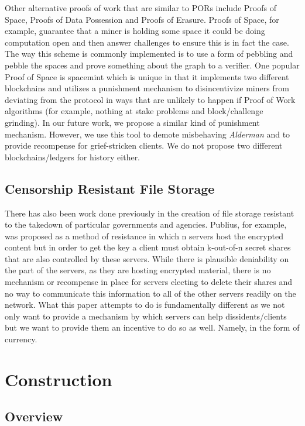 \documentclass{article}
\begin{document}
Other alternative proofs of work that are similar to PORs include Proofs of Space, Proofs of Data Possession and Proofs of Erasure. Proofs of Space, for example, guarantee that a miner is holding some space it could be doing computation open and then answer challenges to ensure this is in fact the case. The way this scheme is commonly implemented is to use a form of pebbling and pebble the spaces and prove something about the graph to a verifier. One popular Proof of Space is spacemint which is unique in that it implements two different blockchains and utilizes a punishment mechanism to disincentivize miners from deviating from the protocol in ways that are unlikely to happen if Proof of Work algorithms (for example, nothing at stake problems and block/challenge grinding). In our future work, we propose a similar kind of punishment mechanism. However, we use this tool to demote misbehaving \emph{Alderman} and to provide recompense for grief-stricken clients. We do not propose two different blockchains/ledgers for history either. 

\subsection{Censorship Resistant File Storage}
There has also been work done previously in the creation of file storage resistant to the takedown of particular governments and agencies. Publius, for example, was proposed as a method of resistance in which n servers host the encrypted content but in order to get the key a client must obtain k-out-of-n secret shares that are also controlled by these servers. While there is plausible deniability on the part of the servers, as they are hosting encrypted material, there is no mechanism or recompense in place for servers electing to delete their shares and no way to communicate this information to all of the other servers readily on the network. What this paper attempts to do is fundamentally different as we not only want to provide a mechanism by which servers can help dissidents/clients but we want to provide them an incentive to do so as well. Namely, in the form of currency. 

\section{Construction}

\subsection{Overview}
\end{document}
